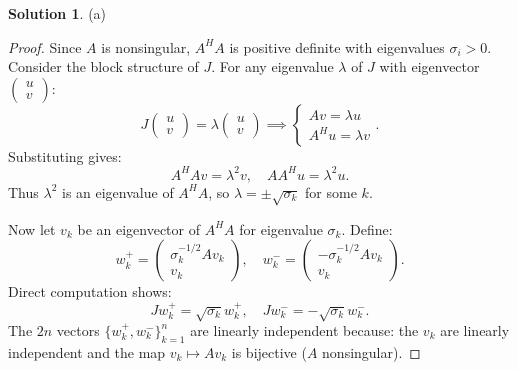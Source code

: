 \documentclass[12pt]{article}
\theoremstyle{definition}
\newtheorem*{solution}{\normalfont\textbf{Solution}}
\begin{document}
\begin{enumerate}[leftmargin=*]
\begin{solution}
        \item[(a)]
            \begin{proof}
                Since \( A \) is nonsingular, \( A^H A \) is positive definite with eigenvalues \( \sigma_i > 0 \). Consider the block structure of \( J \). For any eigenvalue \( \lambda \) of \( J \) with eigenvector \( \begin{pmatrix} u \\ v \end{pmatrix} \):
                \[
                J \begin{pmatrix} u \\ v \end{pmatrix} = \lambda \begin{pmatrix} u \\ v \end{pmatrix} \implies 
                \begin{cases}
                Av = \lambda u \\
                A^Hu = \lambda v
                \end{cases}
                .\]
                Substituting gives:
                \[
                A^H A v = \lambda^2 v, \quad A A^H u = \lambda^2 u.
                \]
                Thus \( \lambda^2 \) is an eigenvalue of \( A^H A \), so \( \lambda = \pm \sqrt{\sigma_k} \) for some \( k \).

                Now let \( v_k \) be an eigenvector of \( A^H A \) for eigenvalue \( \sigma_k \). Define:
                \[
                w_k^+ = \begin{pmatrix} \sigma_k^{-1/2}Av_k \\ v_k \end{pmatrix}, \quad 
                w_k^- = \begin{pmatrix} -\sigma_k^{-1/2}Av_k \\ v_k \end{pmatrix}.
                \]
                Direct computation shows:
                \[
                Jw_k^+ = \sqrt{\sigma_k}w_k^+, \quad 
                Jw_k^- = -\sqrt{\sigma_k}w_k^-.
                \]
                The \( 2n \) vectors \( \{w_k^+, w_k^- \}_{k=1}^n \) are linearly independent because:
                the \( v_k \) are linearly independent
                and the map \( v_k \mapsto Av_k \) is bijective (\( A \) nonsingular).


\end{proof}
\end{solution}
\end{enumerate}
\end{document}
